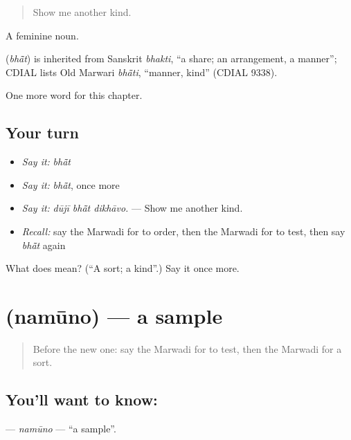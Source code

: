 \begin{quote}
Show me another kind.
\end{quote}

A feminine noun.

\begin{cousinweb}
\textbf{} (\emph{bhā̃t}) is inherited from Sanskrit \emph{bhakti}, \textquotedblleft{}a share; an arrangement, a manner\textquotedblright{}; CDIAL lists Old Marwari \emph{bhā̃ti}, \textquotedblleft{}manner, kind\textquotedblright{} (CDIAL 9338).
\end{cousinweb}

\begin{grammarlens}[title={What you've built}]
One more word for this chapter.
\end{grammarlens}

\subsection*{Your turn}
\begin{itemize}
\raggedright
  \item \emph{Say it:} \emph{bhā̃t}
  \item \emph{Say it:} \emph{bhā̃t}, once more
  \item \emph{Say it:} \emph{dūjī bhā̃t dikhāvo.} — Show me another kind.
  \item \emph{Recall:} say the Marwadi for to order, then the Marwadi for to test, then say \emph{bhā̃t} again
\end{itemize}

\begin{tcolorbox}[breakable,colback=teal!4,colframe=teal!35!black,title={Before you move on}]
What does  mean? (\textquotedblleft{}A sort; a kind\textquotedblright{}.) Say it once more.
\end{tcolorbox}
\section[\texorpdfstring{\mw{नमूनो} (namūno)}{नमूनो (namūno)}]{ (namūno) — a sample}

\label{lesson:MW-C210-namuno}



\begin{quote}
Before the new one: say the Marwadi for to test, then the Marwadi for a sort.
\end{quote}

\subsection*{You'll want to know: }
\textbf{} — \emph{namūno} — \textquotedblleft{}a sample\textquotedblright{}.

